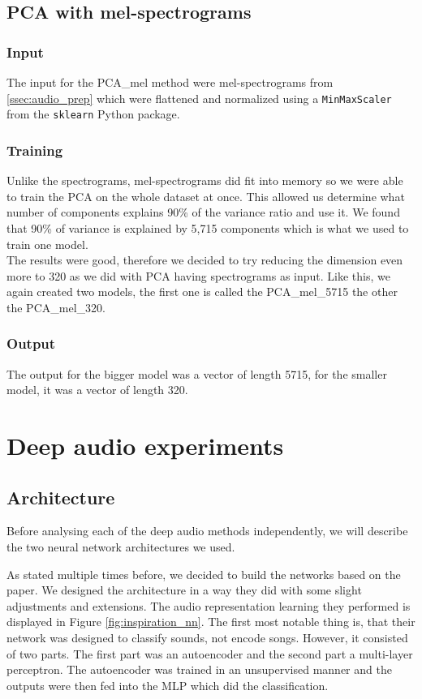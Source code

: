 \subsection{PCA with mel-spectrograms}\label{ssec:pca_mel_experiments}
\subsubsection{Input}
The input for the PCA\_mel method were mel-spectrograms from \ref{ssec:audio_prep} which were flattened and normalized using a \texttt{MinMaxScaler} from the \texttt{sklearn} Python package.

\subsubsection{Training}
Unlike the spectrograms, mel-spectrograms did fit into memory so we were able to train the PCA on the whole dataset at once. This allowed us determine what number of components explains 90\% of the variance ratio and use it. We found that 90\% of variance is explained by 5,715 components which is what we used to train one model. \\
The results were good, therefore we decided to try reducing the dimension even more to 320 as we did with PCA having spectrograms as input. Like this, we again created two models, the first one is called the PCA\_mel\_5715 the other the PCA\_mel\_320. 

\subsubsection{Output}
The output for the bigger model was a vector of length 5715, for the smaller model, it was a vector of length 320.

\section{Deep audio experiments}\label{sec:deep_audio_experiments}

\subsection{Architecture}\label{ssec:nn_architectures}
Before analysing each of the deep audio methods independently, we will describe the two neural network architectures we used. 

As stated multiple times before, we decided to build the networks based on the \cite{inproceedings_RNNs} paper. We designed the architecture in a way they did with some slight adjustments and extensions. The audio representation learning they performed is displayed in Figure \ref{fig:inspiration_nn}. The first most notable thing is, that their network was designed to classify sounds, not encode songs. However, it consisted of two parts. The first part was an autoencoder and the second part a multi-layer perceptron. The autoencoder was trained in an unsupervised manner and the outputs were then fed into the MLP which did the classification.

